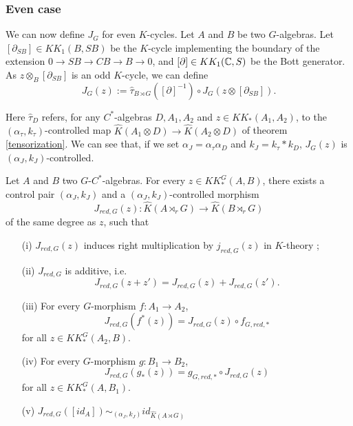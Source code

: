 \subsubsection{Even case}

We can now define $J_G$ for even $K$-cycles. Let $A$ and $B$ be two $G$-algebras. Let $[\partial_{SB}]\in KK_1(B,SB)$ be the $K$-cycle implementing the boundary of the extension $0\rightarrow SB\rightarrow CB\rightarrow B\rightarrow 0$, and $[\partial]\in KK_1(\mathbb C,S)$ be the Bott generator. As $z\otimes_B [\partial_{SB}]$ is an odd $K$-cycle, we can define
\[J_G(z):= \hat\tau_{B\rtimes G}([\partial]^{-1})\circ J_G(z\otimes[\partial_{SB}]).\] 

Here $\hat\tau_D$ refers, for any $C^*$-algebras $D,A_1,A_2$ and $z\in KK_*(A_1,A_2)$, to the $(\alpha_\tau,k_\tau)$-controlled map $\hat K (A_1\otimes D )\rightarrow \hat K(A_2\otimes D)$ of theorem \ref{tensorization}. We can see that, if we set $\alpha_J=\alpha_\tau \alpha_D$ and $k_J=k_\tau * k_D$, $J_G(z)$ is $(\alpha_J,k_J)$-controlled.\\

\begin{prop}\label{Kasparov}
Let $A$ and $B$ two $G$-$C^*$-algebras. For every $z\in KK^G_*(A,B)$, there exists a control pair $(\alpha_J,k_J)$ and a $(\alpha_J,k_J)$-controlled morphism
\[J_{red,G}(z) : \hat K(A\rtimes_r G)\rightarrow \hat K(B\rtimes_r G)\]
of the same degree as $z$, such that
\begin{enumerate}
\item[(i)] $J_{red,G}(z)$ induces right multiplication by $j_{red,G}(z)$ in $K$-theory ;
\item[(ii)] $J_{red,G}$ is additive, i.e.
\[J_{red,G}(z+z')=J_{red,G}(z)+J_{red,G}(z').\]
\item[(iii)] For every $G$-morphism $f : A_1\rightarrow A_2$,
\[J_{red,G}(f^*(z))=J_{red,G}(z)\circ f_{G,red,*}\] for all $z\in KK_*^G(A_2,B)$.
\item[(iv)] For every $G$-morphism $g : B_1\rightarrow B_2$,
\[J_{red,G}(g_*(z))= g_{G,red,*}\circ J_{red,G}(z)\] for all $z\in KK_*^G(A,B_1)$.
\item[(v)] $J_{red,G}([id_A]) \sim_{(\alpha_J,k_J)} id_{\hat K(A\rtimes G)}$
\end{enumerate}
\end{prop}

